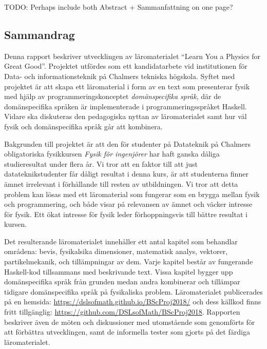 
\thispagestyle{plain}			%

TODO: Perhaps include both Abstract + Sammanfattning on one page?

\begin{binge}

\section*{Sammandrag}

Denna rapport beskriver utvecklingen av läromaterialet ``Learn You a
Physics for Great Good''. Projektet utfördes som ett kandidatarbete vid institutionen
för Data- och informationsteknik på Chalmers tekniska högskola. Syftet
med projektet är att skapa ett läromaterial i form av en text som
presenterar fysik med hjälp av programmeringskonceptet
\textit{domänspecifika språk}, där de domänspecifika språken är
implementerade i programmeringsspråket Haskell. Vidare ska diskuteras
den pedagogiska nyttan av läromaterialet samt hur väl fysik och
domänspecifika språk går att kombinera.

Bakgrunden till projektet är att den för studenter på Datateknik på
Chalmers obligatoriska fysikkursen \textit{Fysik för ingenjörer} har
haft ganska dåliga studieresultat under flera år. Vi tror att en
faktor till att just datateknikstudenter får dåligt resultat i denna
kurs, är att studenterna finner ämnet irrelevant i förhållande till
resten av utbildningen. Vi tror att detta problem kan lösas med ett
läromaterial som fungerar som en brygga mellan fysik och
programmering, och både visar på relevansen av ämnet och väcker
intresse för fysik. Ett ökat intresse för fysik leder förhoppningsvis
till bättre resultat i kursen.

Det resulterande läromaterialet innehåller ett antal kapitel som
behandlar områdena: bevis, fysikalsika dimensioner, matematisk analys,
vektorer, partikelmekanik, och tillämpningar av dem. Varje kapitel
består av fungerande Haskell-kod tillsammans med beskrivande
text. Vissa kapitel bygger upp domänspecifika språk från grunden medan
andra kombinerar och tillämpar tidigare domänspecifika språk på
fysikaliska problem. Läromaterialet publicerades på en hemsida:
\url{https://dslsofmath.github.io/BScProj2018/} och dess källkod finns
fritt tillgänglig:
\url{https://github.com/DSLsofMath/BScProj2018}. Rapporten beskriver
även de möten och diskussioner med utomstående som genomförts för att
förbättra utvecklingen, samt de informella tester som gjorts på det
färdiga läromaterialet.


\end{binge}

